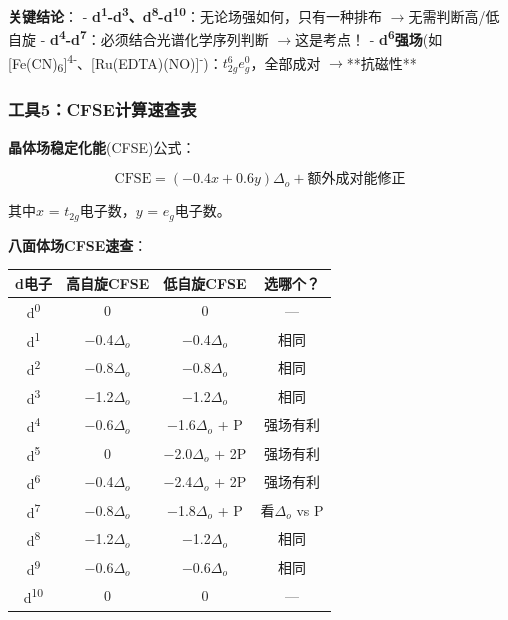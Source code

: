 \documentclass[a4paper,11pt]{ctexart}
\newcounter{none}
\newcommand{\箭}{\ensuremath{\rightarrow}}
\newcommand{\左箭}{\ensuremath{\leftarrow}}
\newcommand{\上箭}{\ensuremath{\uparrow}}
\newcommand{\下箭}{\ensuremath{\downarrow}}
\newcommand{\衡}{\ensuremath{\rightleftharpoons}}
\newcommand{\双箭}{\ensuremath{\leftrightarrow}}
\newcommand{\约等于}{\ensuremath{\approx}}
\newcommand{\小于等于}{\ensuremath{\leq}}
\newcommand{\大于等于}{\ensuremath{\geq}}
\newcommand{\不等于}{\ensuremath{\neq}}
\newcommand{\西格马}{\ensuremath{\sigma}}
\newcommand{\派}{\ensuremath{\pi}}
\begin{document}
\textbf{关键结论}：
- \textbf{d\textsuperscript{1}-d\textsuperscript{3}、d\textsuperscript{8}-d\textsuperscript{10}}：无论场强如何，只有一种排布 \箭 无需判断高/低自旋
- \textbf{d\textsuperscript{4}-d\textsuperscript{7}}：必须结合光谱化学序列判断 \箭 这是考点！
- \textbf{d\textsuperscript{6}强场}(如{[}Fe(CN)\textsubscript{6}{]}\textsuperscript{4-}、{[}Ru(EDTA)(NO){]}\textsuperscript{-})：\(t_{2g}^{6}e_{g}^{0}\)，全部成对 \箭 **抗磁性**

\subsubsection{工具5：CFSE计算速查表}\label{ux5de5ux51775cfseux8ba1ux7b97ux901fux67e5ux8868}

\textbf{晶体场稳定化能}(CFSE)公式：

\[\text{CFSE} = (-0.4x + 0.6y) \Delta_o + \text{额外成对能修正}\]

其中\(x\) = \(t_{2g}\)电子数，\(y\) = \(e_g\)电子数。

\textbf{八面体场CFSE速查}：

{\def\LTcaptype{none} %
\begin{longtable}[]{@{}cccc@{}}
\toprule\noalign{}
d电子 & 高自旋CFSE & 低自旋CFSE & 选哪个？ \\
\midrule\noalign{}
\endhead
\bottomrule\noalign{}
\endlastfoot
d\textsuperscript{0} & 0 & 0 & --- \\
d\textsuperscript{1} & −0.4\(\Delta_o\) & −0.4\(\Delta_o\) & 相同 \\
d\textsuperscript{2} & −0.8\(\Delta_o\) & −0.8\(\Delta_o\) & 相同 \\
d\textsuperscript{3} & −1.2\(\Delta_o\) & −1.2\(\Delta_o\) & 相同 \\
d\textsuperscript{4} & −0.6\(\Delta_o\) & −1.6\(\Delta_o\) + P & 强场有利 \\
d\textsuperscript{5} & 0 & −2.0\(\Delta_o\) + 2P & 强场有利 \\
d\textsuperscript{6} & −0.4\(\Delta_o\) & −2.4\(\Delta_o\) + 2P & 强场有利 \\
d\textsuperscript{7} & −0.8\(\Delta_o\) & −1.8\(\Delta_o\) + P & 看\(\Delta_o\) vs P \\
d\textsuperscript{8} & −1.2\(\Delta_o\) & −1.2\(\Delta_o\) & 相同 \\
d\textsuperscript{9} & −0.6\(\Delta_o\) & −0.6\(\Delta_o\) & 相同 \\
d\textsuperscript{10} & 0 & 0 & --- \\
\end{longtable}
}
\end{document}
